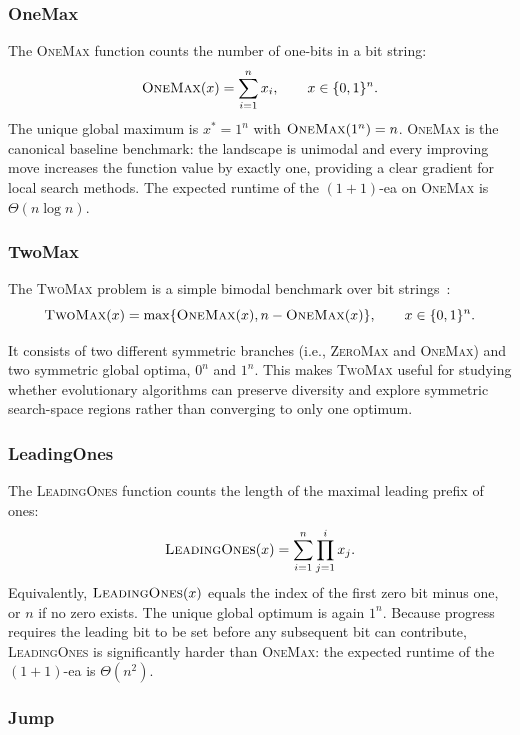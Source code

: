 \subsubsection{OneMax}

The \textsc{OneMax} function counts the number of one-bits in a bit string:
\[
  \textsc{OneMax}(x) = \sum_{i=1}^{n} x_i, \qquad x \in \{0,1\}^n.
\]
The unique global maximum is $x^{*} = 1^n$ with $\textsc{OneMax}(1^n) = n$.
\textsc{OneMax} is the canonical baseline benchmark: the landscape is
unimodal and every
improving move increases the function value by exactly one, providing
a clear gradient
for local search methods. The expected runtime of the
$(1+1)$-\acrfull{ea} on \textsc{OneMax} is
$\Theta(n \log n)$.~\cite{droste2002analysis}

\subsubsection{TwoMax}
The \textsc{TwoMax} problem is a simple bimodal benchmark over bit
strings~\cite{oliveto2014runtime}:
\[
  \textsc{TwoMax}(x) = \max\{\textsc{OneMax}(x), n -
  \textsc{OneMax}(x)\}, \qquad x \in \{0,1\}^n.
\]

It consists of two different symmetric branches (i.e.,
\textsc{ZeroMax} and \textsc{OneMax}) and two symmetric global
optima, $0^n$ and $1^n$. This makes \textsc{TwoMax} useful for
studying whether evolutionary algorithms can preserve diversity and
explore symmetric search-space regions rather than converging to only
one optimum.

\subsubsection{LeadingOnes}

The \textsc{LeadingOnes} function counts the length of the maximal
leading prefix of
ones:
\[
  \textsc{LeadingOnes}(x) = \sum_{i=1}^{n} \prod_{j=1}^{i} x_j.
\]
Equivalently, $\textsc{LeadingOnes}(x)$ equals the index of the first
zero bit minus
one, or $n$ if no zero exists. The unique global optimum is again $1^n$. Because
progress requires the leading bit to be set before any subsequent bit
can contribute,
\textsc{LeadingOnes} is significantly harder than \textsc{OneMax}:
the expected runtime
of the $(1+1)$-\acrshort{ea} is $\Theta(n^2)$.~\cite{droste2002analysis}

\subsubsection{Jump}

